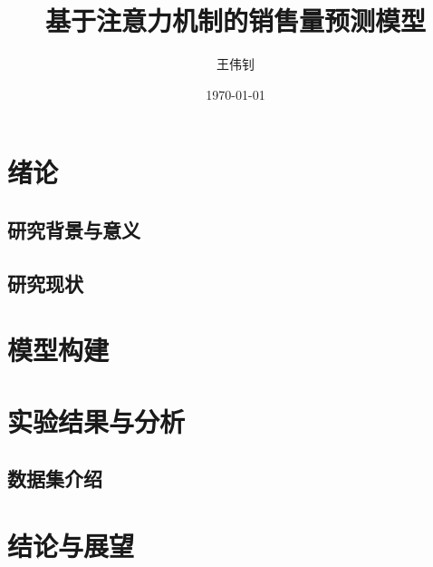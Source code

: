 \documentclass[12pt]{article}
\title{基于注意力机制的销售量预测模型}
\author{王伟钊}
\date{\today}
\begin{document}
\maketitle

\begin{abstract}
    
\end{abstract}

\newpage

\tableofcontents

\newpage

\section{绪论}

\subsection{研究背景与意义}
\subsection{研究现状}


\newpage

\section{模型构建}

\newpage

\section{实验结果与分析}
\subsection{数据集介绍}


\newpage
\section{结论与展望}




\appendix
\end{document}
